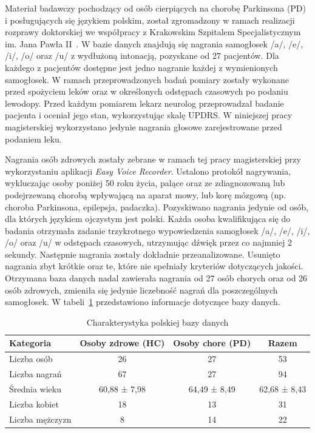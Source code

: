 Materiał badawczy pochodzący od osób cierpiących na chorobę Parkinsona (PD) i posługujących się językiem polskim, został zgromadzony w ramach
realizacji rozprawy doktorskiej we współpracy z Krakowskim Szpitalem Specjalistycznym im.
Jana Pawła II~\cite{daria:2018}.
W bazie danych znajdują się nagrania samogłosek /a/, /e/, /i/, /o/ oraz /u/ z wydłużoną intonacją, pozyskane od 27 pacjentów.
Dla każdego z pacjentów dostępne jest jedno nagranie każdej z wymienionych samogłosek.
W ramach przeprowadzonych badań pomiary zostały wykonane przed spożyciem leków oraz w określonych odstępach czasowych po podaniu lewodopy.
Przed każdym pomiarem lekarz neurolog przeprowadzał badanie pacjenta i oceniał jego stan, wykorzystując skalę UPDRS\@.
W niniejszej pracy magisterskiej wykorzystano jedynie nagrania głosowe zarejestrowane przed podaniem leku.

Nagrania osób zdrowych zostały zebrane w ramach tej pracy magisterskiej przy wykorzystaniu aplikacji \emph{Easy Voice Recorder}.
Ustalono protokół nagrywania, wykluczając osoby poniżej 50 roku życia, palące oraz ze zdiagnozowaną lub podejrzewaną chorobą wpływającą na aparat mowy, lub korę mózgową (np.
choroba Parkinsona, epilepsja, padaczka).
Pozyskiwano nagrania jedynie od osób, dla których językiem ojczystym jest polski.
Każda osoba kwalifikująca się do badania otrzymała zadanie trzykrotnego wypowiedzenia samogłosek /a/, /e/, /i/, /o/ oraz /u/ w odstępach czasowych, utrzymując dźwięk przez co najmniej 2 sekundy.
Następnie nagrania zostały dokładnie przeanalizowane.
Usunięto nagrania zbyt krótkie oraz te, które nie spełniały kryteriów dotyczących jakości.
Otrzymana baza danych nadal zawierała nagrania od 27 osób chorych oraz od 26 osób zdrowych, zmieniła się jedynie liczebność nagrań dla poszczególnych samogłosek.
W tabeli~\ref{tab:polish_database} przedstawiono informacje dotyczące bazy danych.

\begin{table}[h]
\centering
\caption{Charakterystyka polskiej bazy danych}
\label{tab:polish_database}
\begin{tabular}{|l|c|c|c|}
\hline
\textbf{Kategoria} &\textbf{Osoby zdrowe (HC)} &\textbf{Osoby chore (PD)} &\textbf{Razem} \\ \hline
Liczba osób &26 &27 &53\\ \hline
Liczba nagrań &67 &27 &94\\ \hline
Średnia wieku &60,88 ± 7,98 &64,49 ± 8,49  &62,68 ± 8,43\\ \hline
Liczba kobiet &18 &13 &31\\ \hline
Liczba mężczyzn &8 &14 &22 \\ \hline
\end{tabular}
\end{table}

